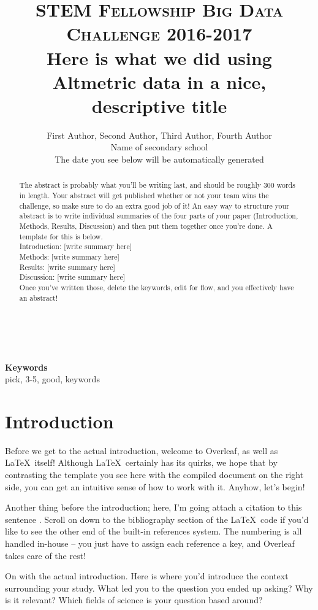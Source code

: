\documentclass[10pt,twocolumn,letterpaper]{article}
\title{
		\usefont{OT1}{bch}{b}{n}
		\normalfont \normalsize \textsc{STEM Fellowship Big Data Challenge 2016-2017} \\ [10pt]
		\huge Here is what we did using Altmetric data in a nice, descriptive title \\
}
\author[0]{First Author, Second Author, Third Author, Fourth Author \\
		Name of secondary school \\
        The date you see below will be automatically generated}
\begin{document}
\maketitle

\begin{abstract}
The abstract is probably what you'll be writing last, and should be roughly 300 words in length. Your abstract will get published whether or not your team wins the challenge, so make sure to do an extra good job of it! An easy way to structure your abstract is to write individual summaries of the four parts of your paper (Introduction, Methods, Results, Discussion) and then put them together once you're done. A template for this is below. \\
Introduction: [write summary here] \\
Methods: [write summary here] \\
Results: [write summary here] \\
Discussion: [write summary here] \\
Once you've written those, delete the keywords, edit for flow, and you effectively have an abstract!
\end{abstract} \\ 
\\ 
{\textbf{Keywords} \\
pick, 3-5, good, keywords}

\section{Introduction}
Before we get to the actual introduction, welcome to Overleaf, as well as \LaTeX\ itself! Although \LaTeX\ certainly has its quirks, we hope that by contrasting the template you see here with the compiled document on the right side, you can get an intuitive sense of how to work with it. Anyhow, let's begin!

Another thing before the introduction; here, I'm going attach a citation to this sentence \cite{a_reference}. Scroll on down to the bibliography section of the \LaTeX\ code if you'd like to see the other end of the built-in references system. The numbering is all handled in-house -- you just have to assign each reference a key, and Overleaf takes care of the rest!

On with the actual introduction. Here is where you'd introduce the context surrounding your study. What led you to the question you ended up asking? Why is it relevant? Which fields of science is your question based around?
\end{document}
